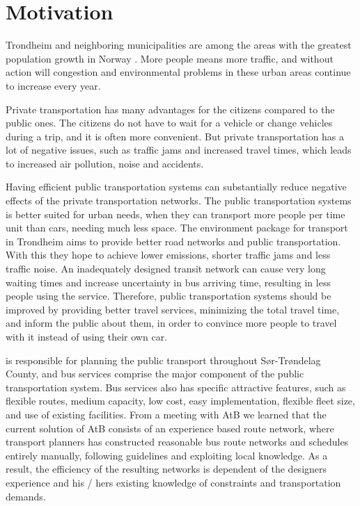 \section{Motivation} 

Trondheim and neighboring municipalities are among the areas with the greatest population growth in Norway \citep{website:miljopakken}. More people means more traffic, and without action will congestion and environmental problems in these urban areas continue to increase every year. 

Private transportation has many advantages for the citizens compared to the public ones. The citizens do not have to wait for a vehicle or change vehicles during a trip, and it is often more convenient. But private transportation has a lot of negative issues, such as traffic jams and increased travel times, which leads to increased air pollution, noise and accidents. 
 
Having efficient public transportation systems can substantially reduce negative effects of the private transportation networks. The public transportation systems is better suited for urban needs, when they can transport more people per time unit than cars, needing much less space. The environment package \citep{website:miljopakken} for transport in Trondheim aims to provide better road networks and public transportation. With this they hope to achieve lower emissions, shorter traffic jams and less traffic noise. An inadequately designed transit network can cause very long waiting times and increase uncertainty in bus arriving time, resulting in less people using the service. Therefore, public transportation systems should be improved by providing better travel services, minimizing the total travel time, and inform the public about them, in order to convince more people to travel with it instead of using their own car.

\citet{website:atb} is responsible for planning the public transport throughout Sør-Trøndelag County, and bus services comprise the major component of the public transportation system. Bus services also has specific attractive features, such as flexible routes, medium capacity, low cost, easy implementation, flexible fleet size, and use of existing facilities. 
From a meeting with AtB we learned that the current solution of AtB consists of an experience based route network, where transport planners has constructed reasonable bus route networks and schedules entirely manually, following guidelines and exploiting local knowledge. As a result, the efficiency of the resulting networks is dependent of the designers experience and his / hers existing knowledge of constraints and transportation demands. 

